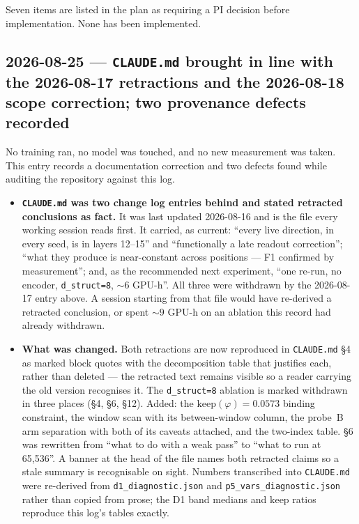 \documentclass[11pt,a4paper]{article}
\newcommand{\code}[1]{\texttt{\small #1}}
\begin{document}
Seven items are listed in the plan as requiring a PI decision before
implementation. None has been implemented.

\subsection*{2026-08-25 --- \code{CLAUDE.md} brought in line with the
2026-08-17 retractions and the 2026-08-18 scope correction; two provenance
defects recorded}

No training ran, no model was touched, and no new measurement was taken. This
entry records a documentation correction and two defects found while auditing
the repository against this log.

\begin{itemize}

\item \textbf{\code{CLAUDE.md} was two change log entries behind and stated
retracted conclusions as fact.} It was last updated 2026-08-16 and is the file
every working session reads first. It carried, as current: ``every live
direction, in every seed, is in layers 12--15'' and ``functionally a late
readout correction''; ``what they produce is near-constant across positions ---
F1 confirmed by measurement''; and, as the recommended next experiment,
``one re-run, no encoder, \code{d\_struct=8}, ${\sim}6$ GPU-h''. All three were
withdrawn by the 2026-08-17 entry above. A session starting from that file would
have re-derived a retracted conclusion, or spent ${\sim}9$ GPU-h on an ablation
this record had already withdrawn.

\item \textbf{What was changed.} Both retractions are now reproduced in
\code{CLAUDE.md} \S4 as marked block quotes with the decomposition table that
justifies each, rather than deleted --- the retracted text remains visible so a
reader carrying the old version recognises it. The \code{d\_struct=8} ablation
is marked withdrawn in three places (\S4, \S6, \S12). Added: the
$\mathrm{keep}(\varphi) = 0.0573$ binding constraint, the window scan with its
between-window column, the probe~B arm separation with both of its caveats
attached, and the two-index table. \S6 was rewritten from ``what to do with a
weak pass'' to ``what to run at 65{,}536''. A banner at the head of the file
names both retracted claims so a stale summary is recognisable on sight. Numbers
transcribed into \code{CLAUDE.md} were re-derived from
\code{d1\_diagnostic.json} and \code{p5\_vars\_diagnostic.json} rather than
copied from prose; the D1 band medians and $\mathrm{keep}$ ratios reproduce this
log's tables exactly.


\end{itemize}
\end{document}
